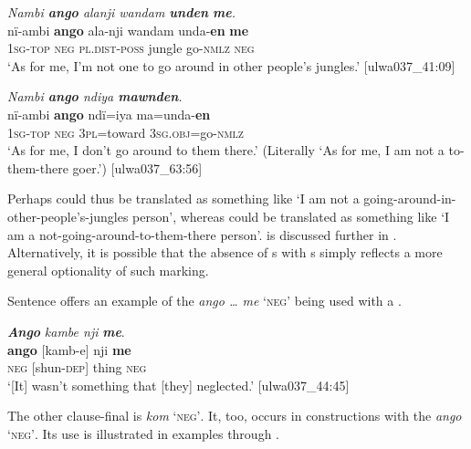 \ea%
    \label{ex:syntax:148}
          \textit{Nambi \textbf{ango} alanji wandam \textbf{unden} \textbf{me}.}\\
\gll nï-ambi  \textbf{ango}  ala-nji      wandam  unda{}-\textbf{en}  \textbf{me}\\
    1\textsc{sg-top}  \textsc{neg}  \textsc{pl.dist-poss}  jungle    go-\textsc{nmlz}  \textsc{neg}\\
\glt `As for me, I’m not one to go around in other people’s jungles.’ [ulwa037\_41:09]
\z

\ea%
    \label{ex:syntax:149}
          \textit{Nambi \textbf{ango} ndiya \textbf{mawnden}.}\\
\gll nï-ambi  \textbf{ango}  ndï=iya    ma=unda{}-\textbf{en}\\
    1\textsc{sg-top}  \textsc{neg}  3\textsc{pl}=toward  3\textsc{sg.obj}=go-\textsc{nmlz}\\
\glt `As for me, I don’t go around to them there.’ (Literally ‘As for me, I am not a to-them-there goer.’) [ulwa037\_63:56]
\z

Perhaps  could thus be translated as something like ‘I am not a going-around-in-other-people’s-jungles person’, whereas  could be translated as something like ‘I am a not-going-around-to-them-there person’.  is discussed further in . Alternatively, it is possible that the absence of s with s simply reflects a more general optionality of such marking.


  Sentence  offers an example of the  \textit{ango … me} ‘\textsc{neg}’ being used with a .

\ea%
    \label{ex:syntax:150}
          \textbf{\textit{Ango}} \textit{kambe nji} \textbf{\textit{me}}.\\
\gll \textbf{ango}  [kamb-e]  nji    \textbf{me}\\
    \textsc{neg}  [shun-\textsc{dep]}  thing  \textsc{neg}\\
\glt `[It] wasn’t something that [they] neglected.’ [ulwa037\_44:45]
\z

The other clause-final  is \textit{kom} ‘\textsc{neg’}. It, too, occurs in  constructions with the  \textit{ango} ‘\textsc{neg’}. Its use is illustrated in examples  through .

